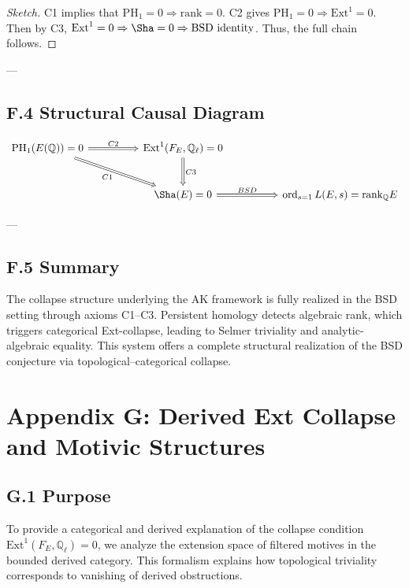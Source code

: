 \begin{proof}[Sketch]
C1 implies that \( \mathrm{PH}_1 = 0 \Rightarrow \mathrm{rank} = 0 \).  
C2 gives \( \mathrm{PH}_1 = 0 \Rightarrow \mathrm{Ext}^1 = 0 \).  
Then by C3, \( \mathrm{Ext}^1 = 0 \Rightarrow \Sha = 0 \Rightarrow \text{BSD identity} \).  
Thus, the full chain follows.
\end{proof}

---

\subsection*{F.4 Structural Causal Diagram}

\[
\begin{tikzcd}[row sep=large, column sep=huge]
\mathrm{PH}_1(E(\mathbb{Q})) = 0 \arrow[r, Rightarrow, "C2"] \arrow[dr, Rightarrow, swap, "C1"] &
\mathrm{Ext}^1(F_E, \mathbb{Q}_\ell) = 0 \arrow[d, Rightarrow, "C3"] \\
& \Sha(E) = 0 \arrow[r, Rightarrow, "BSD"] & \operatorname{ord}_{s=1}L(E,s) = \mathrm{rank}_{\mathbb{Q}}E
\end{tikzcd}
\]

---

\subsection*{F.5 Summary}

The collapse structure underlying the AK framework is fully realized in the BSD setting through axioms C1–C3.  
Persistent homology detects algebraic rank, which triggers categorical Ext-collapse,  
leading to Selmer triviality and analytic-algebraic equality.  
This system offers a complete structural realization of the BSD conjecture via topological–categorical collapse.



\section*{Appendix G: Derived Ext Collapse and Motivic Structures}

\subsection*{G.1 Purpose}

To provide a categorical and derived explanation of the collapse condition \( \mathrm{Ext}^1(F_E, \mathbb{Q}_\ell) = 0 \),  
we analyze the extension space of filtered motives in the bounded derived category.  
This formalism explains how topological triviality corresponds to vanishing of derived obstructions.

